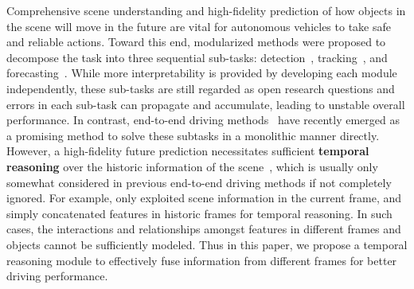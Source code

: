 \documentclass[10pt,twocolumn,letterpaper]{article}
\begin{document}
Comprehensive scene understanding and high-fidelity prediction of how objects in the scene will move in the future are vital for autonomous vehicles to take safe and reliable actions. Toward this end, modularized methods were proposed to decompose the task into three sequential sub-tasks: detection~\cite{li2022bevformer, liu2022bevfusion, lian2022semi, lian2022monojsg, lian2022exploring}, tracking~\cite{zhang2022bytetrack,cao2022observation}, and forecasting~\cite{jia2022hdgt,gu2021densetnt,wang2022transferable,wang2021socially,casas2020implicit,hu2021fiery,wei2021perceive,jia2023towards}. While more interpretability is provided by developing each module independently, these sub-tasks are still regarded as open research questions and errors in each sub-task can propagate and accumulate, leading to unstable overall performance. In contrast, end-to-end driving methods~\cite{shao2022safety, chen2022learning, chen2021learning} have recently emerged as a promising method to solve these subtasks in a monolithic manner directly. However, a high-fidelity future prediction necessitates sufficient \textbf{temporal reasoning} over the historic information of the scene~\cite{feichtenhofer2019slowfast,shao2020temporal}, which is usually only somewhat considered in previous end-to-end driving methods if not completely ignored. For example, \cite{chitta2022transfuser,chen2022learning} only exploited scene information in the current frame, and~\cite{toromanoff2020end} simply concatenated features in historic frames for temporal reasoning. In such cases, the interactions and relationships amongst features in different frames and objects cannot be sufficiently modeled. Thus in this paper, we propose a temporal reasoning module to effectively fuse information from different frames for better driving performance.
\end{document}
